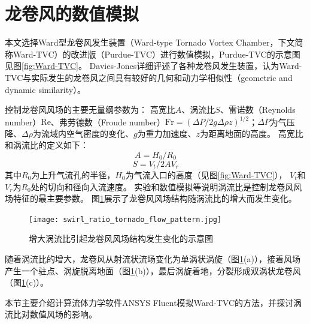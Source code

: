 \section{龙卷风的数值模拟}
本文选择Ward型龙卷风发生装置（Ward-type Tornado Vortex Chamber，下文简称Ward-TVC）\cite{ward1972exploration}的改进版（Purdue-TVC）\cite{church1979characteristics}进行数值模拟，Purdue-TVC的示意图见图\ref{fig:Ward-TVC}。
Davies-Jones\cite{davies1976laboratory}详细评述了各种龙卷风发生装置，认为Ward-TVC与实际发生的龙卷风之间具有较好的几何和动力学相似性（geometric and dynamic similarity）。

控制龙卷风风场的主要无量纲参数为\cite{lewellen1993tornado}：
高宽比$A$、涡流比$S$、雷诺数（Reynolds number）$\mathrm{Re}$、弗劳德数（Froude number）$\mathrm{Fr}=\left( \Delta P/ 2g\Delta \rho z\right)^{1/2}$；$\Delta P$为气压降、$\Delta \rho$为流域内空气密度的变化、$g$为重力加速度、$z$为距离地面的高度。
高宽比和涡流比的定义如下：
\begin{equation}
  A = H_0/R_0
\end{equation}
\begin{equation}
  S = V_t/2A V_r
\end{equation}
其中$R_0$为上升气流孔的半径，$H_0$为气流入口的高度（见图\ref{fig:Ward-TVC}），
$V_t$和$V_r$为$R_0$处的切向和径向入流速度。
实验\cite{ward1972exploration}\cite{church1979characteristics}\cite{snow1982review}和数值模拟\cite{davies1976laboratory}等说明涡流比是控制龙卷风风场特征的最主要参数。
图\ref{fig:swirl}展示了龙卷风风场结构随涡流比的增大而发生变化\cite{hangan2008swirl}。
\begin{figure}[!htbp]
  \centering
  \texttt{[image: swirl\_ratio\_tornado\_flow\_pattern.jpg]}
  \caption{增大涡流比引起龙卷风风场结构发生变化的示意图}\label{fig:swirl}
\end{figure}

随着涡流比的增大，龙卷风从射流状流场变化为单涡状涡旋（图\ref{fig:swirl}(a)），接着风场产生一个驻点、涡旋脱离地面（图\ref{fig:swirl}(b)），最后涡旋着地，分裂形成双涡状龙卷风（图\ref{fig:swirl}(c)）。

本节主要介绍计算流体力学软件ANSYS Fluent模拟Ward-TVC的方法，并探讨涡流比对数值风场的影响。

